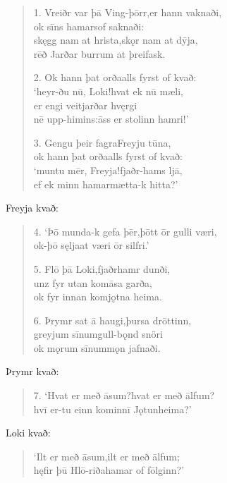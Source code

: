 \documentclass[12pt,letterpaper]{book}
\newcommand{\gap}[1][.25in]{\hspace{#1}}
\begin{document}
\resetlinenumber
\begin{linenumbers}

\begin{verse}
1. Vreiðr var þā Ving-þōrr,\gap er hann vaknaði,\\
ok sīns hamars\gap of saknaði:\\
skęgg nam at hrista,\gap skǫr nam at dȳja,\\
rēð Jarðar burr\gap um at þreifask.

2. Ok hann þat orða\gap alls fyrst of kvað:\\
`heyr-ðu nū, Loki!\gap hvat ek nū mæli,\\
er engi veit\gap jarðar hvęrgi\\
nē upp-himins:\gap āss er stolinn hamri!'

3. Gengu þeir fagra\gap Freyju tūna,\\
ok hann þat orða\gap alls fyrst of kvað:\\
`muntu mēr, Freyja!\gap fjaðr-hams ljā,\\
ef ek minn hamar\gap mætta-k hitta?'
\end{verse}

\noindent Freyja kvað:

\begin{verse}
4. `Þō munda-k gefa þēr,\gap þōtt ōr gulli væri,\\
ok-þō sęlja\gap at væri ōr silfri.'

5. Flō þā Loki,\gap fjaðrhamr dunði,\\
unz fyr utan kom\gap āsa garða,\\
ok fyr innan kom\gap jǫtna heima.

6. Þrymr sat ā haugi,\gap þursa drōttinn,\\
greyjum sīnum\gap gull-bǫnd snöri\\
ok mǫrum sīnum\gap mǫn jafnaði.
\end{verse}

\noindent Þrymr kvað:

\begin{verse}
7. `Hvat er með āsum?\gap hvat er með ālfum?\\
hvī er-tu einn kominn\gap ī Jǫtunheima?'
\end{verse}

\noindent Loki kvað:

\begin{verse}
`Ilt er með āsum,\gap ilt er með ālfum;\\
hęfir þū Hlō-riða\gap hamar of fōlginn?'
\end{verse}


\end{linenumbers}
\end{document}
